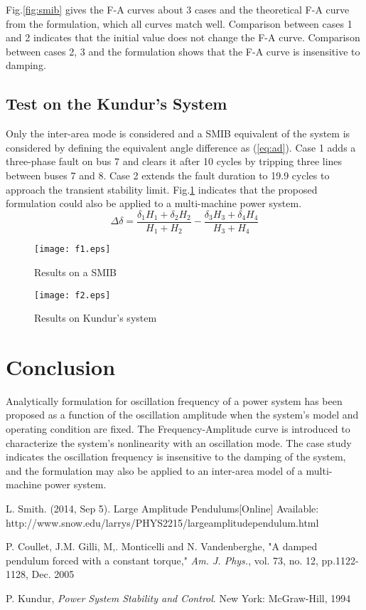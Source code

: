 \documentclass[journal]{IEEEtran}
\begin{document}
Fig.\ref{fig:smib} gives the F-A curves about 3 cases and the theoretical F-A curve from the formulation, which all curves match well. Comparison between cases 1 and 2 indicates that the initial value does not change the F-A curve. Comparison between cases 2, 3 and the formulation shows that the F-A curve is insensitive to damping.

\subsection{Test on the Kundur's System}
Only the inter-area mode is considered and a SMIB equivalent of the system is considered by defining the equivalent angle difference as (\ref{eq:ad}). Case 1 adds a three-phase fault on bus 7 and clears it after 10 cycles by tripping three lines between buses 7 and 8. Case 2 extends the fault duration to 19.9 cycles to approach the transient stability limit. Fig.\ref{fig:kundur} indicates that the proposed formulation could also be applied to a multi-machine power system.
\begin{equation} \label{eq:ad}
\Delta\delta=\frac{\delta_{1}H_{1}+\delta_{2}H_{2}}{H_{1}+H_{2}}-\frac{\delta_{3}H_{3}+\delta_{4}H_{4}}{H_{3}+H_{4}}
\end{equation}
\begin{figure}[htbp]
\begin{minipage}[t]{0.49\linewidth}
\raggedleft
\texttt{[image: f1.eps]}
\caption{Results on a SMIB} \label{fig:smib}
\end{minipage}
\begin{minipage}[t]{0.49\linewidth}
\raggedright
\texttt{[image: f2.eps]}
\caption{Results on Kundur's system} \label{fig:kundur}
\end{minipage}
\end{figure}

\section{Conclusion}
Analytically formulation for oscillation frequency of a power system has been proposed as a function of the oscillation amplitude when the system's model and operating condition are fixed. The Frequency-Amplitude curve is introduced to characterize the system's nonlinearity with an oscillation mode. The case study indicates the oscillation frequency is insensitive to the damping of the system, and the formulation may also be applied to an inter-area model of a multi-machine power system.


\begin{thebibliography}{99}
  L. Smith. (2014, Sep 5). Large Amplitude Pendulums[Online] Available:  http://www.snow.edu/larrys/PHYS2215/largeamplitudependulum.html

 P. Coullet, J.M. Gilli, M,. Monticelli and N. Vandenberghe, "A damped pendulum forced with a constant torque,"
\emph{Am. J. Phys.}, vol. 73, no. 12, pp.1122-1128, Dec. 2005

 P. Kundur,
\emph{Power System Stability and Control}. New York: McGraw-Hill, 1994

\end{thebibliography}
\end{document}
